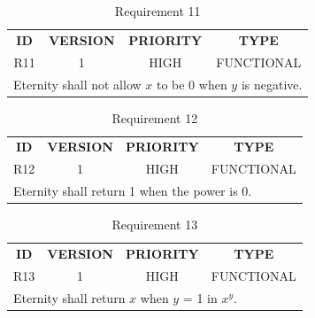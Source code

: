 \documentclass[11pt,a4paper]{report}
\theoremstyle{definition}
\theoremstyle{remark}
\begin{document}
        \begin{table}[ht]
        \centering
            \begin{tabular}{cccc} %
                \textbf{ID} & \textbf{VERSION} & \textbf{PRIORITY} & \textbf{TYPE}\\
                        R11  &           1      &           HIGH    &      FUNCTIONAL\\
                \hline
                \multicolumn{4}{l}{Eternity shall not allow $x$ to be 0 when $y$ is negative.}
            \end{tabular}
            \caption{Requirement 11}
            \label{tab:table-requirements-11}
        \end{table}
        \vspace{3em}
        
        \begin{table}[ht]
        \centering
            \begin{tabular}{cccc} %
                \textbf{ID} & \textbf{VERSION} & \textbf{PRIORITY} & \textbf{TYPE}\\
                        R12  &           1      &           HIGH    &      FUNCTIONAL\\
                \hline
                \multicolumn{4}{l}{Eternity shall return 1 when the power is 0.}
            \end{tabular}
            \caption{Requirement 12}
            \label{tab:table-requirements-12}
        \end{table}
        \vspace{3em}
        
        \begin{table}[ht]
        \centering
            \begin{tabular}{cccc} %
                \textbf{ID} & \textbf{VERSION} & \textbf{PRIORITY} & \textbf{TYPE}\\
                        R13  &           1      &           HIGH    &      FUNCTIONAL\\
                \hline
                \multicolumn{4}{l}{Eternity shall return $x$ when $y$ = 1 in $x^y$.}
            \end{tabular}
            \caption{Requirement 13}
            \label{tab:table-requirements-13}
        \end{table}
        \vspace{3em}
        
\end{document}
